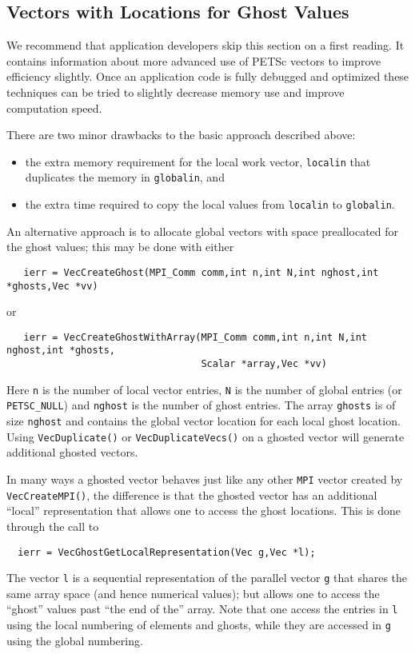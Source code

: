 \subsection{Vectors with Locations for Ghost Values}

We recommend that application developers skip this section on a first reading.
It contains information about more advanced use of PETSc vectors to improve 
efficiency slightly. Once an application code is fully debugged and optimized
these techniques can be tried to slightly decrease memory use and improve 
computation speed.

There are two minor drawbacks to the basic approach described above:
\begin{itemize}
\item the extra memory requirement for the local work vector, {\tt localin} that
      duplicates the memory in {\tt globalin}, and
\item the extra time required to copy the local values from {\tt localin} to 
      {\tt globalin}.
\end{itemize}

An alternative approach is to allocate global vectors with space preallocated for 
the ghost values; this may be done with either 
\begin{verbatim}
   ierr = VecCreateGhost(MPI_Comm comm,int n,int N,int nghost,int *ghosts,Vec *vv)
\end{verbatim}
or
\begin{verbatim}
   ierr = VecCreateGhostWithArray(MPI_Comm comm,int n,int N,int nghost,int *ghosts,
                                  Scalar *array,Vec *vv)
\end{verbatim}
Here   {\tt n} is the 
number of local vector entries, {\tt N} is the number of 
global entries (or {\tt PETSC\_NULL}) and {\tt nghost} is the number of 
ghost entries. The array {\tt ghosts} is of size {\tt nghost} and contains the 
global vector location for each local ghost location. Using {\tt VecDuplicate()}
or {\tt VecDuplicateVecs()} on a ghosted vector will generate additional ghosted vectors.

In many ways a ghosted vector behaves just like any other {\tt MPI} vector created 
by {\tt VecCreateMPI()}, the difference is that the ghosted vector has an additional 
``local'' representation that allows one to access the ghost locations. This is done
through the call to  
\begin{verbatim}
  ierr = VecGhostGetLocalRepresentation(Vec g,Vec *l);
\end{verbatim}
The vector {\tt l} is a 
sequential representation of the parallel vector {\tt g} 
that shares the same array space (and hence numerical values); but allows one to 
access the ``ghost'' values past ``the end of the'' array. Note that one access the 
entries in {\tt l} using the local numbering of elements and ghosts, while they 
are accessed in {\tt g} using the global numbering.

